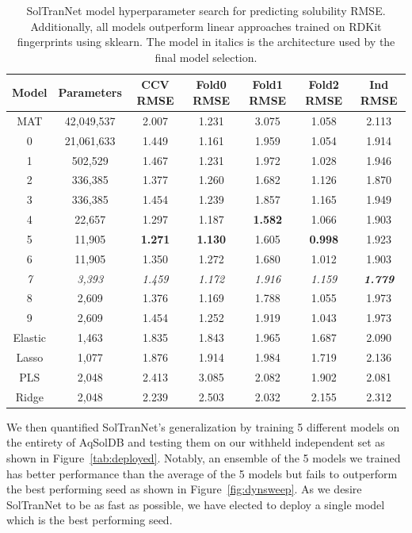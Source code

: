\documentclass[journal=jmcmar,manuscript=article]{achemso}
\begin{document}
\begin{table}
    \begin{tabular}{|c|c|c|c|c|c|c|}
        \hline
         Model & Parameters & CCV RMSE & Fold0 RMSE & Fold1 RMSE & Fold2 RMSE & Ind RMSE \\
         \hline
         MAT & 42,049,537 & 2.007 & 1.231 & 3.075 & 1.058 & 2.113  \\
         \hline
         0 & 21,061,633 & 1.449 & 1.161 & 1.959 & 1.054 & 1.914 \\
         1 & 502,529 & 1.467 & 1.231 & 1.972 & 1.028 & 1.946 \\
         2 & 336,385 & 1.377 & 1.260 & 1.682 & 1.126 & 1.870 \\
         3 & 336,385 & 1.454 & 1.239 & 1.857 & 1.165 & 1.949 \\
         4 & 22,657 & 1.297 & 1.187 & \textbf{1.582} & 1.066 & 1.903 \\
         5 & 11,905 & \textbf{1.271} & \textbf{1.130} & 1.605 & \textbf{0.998} & 1.923 \\
         6 & 11,905 & 1.350 & 1.272 & 1.680 & 1.012 & 1.903\\
         \emph{7} & \emph{3,393} & \emph{1.459} & \emph{1.172} & \emph{1.916} & \emph{1.159} & \emph{\textbf{1.779}}\\
         8 & 2,609 & 1.376 & 1.169 & 1.788 & 1.055  & 1.973 \\
         9 & 2,609 & 1.454 & 1.252 & 1.919 & 1.043  & 1.973 \\
         \hline
         Elastic & 1,463 & 1.835 & 1.843 & 1.965 & 1.687  & 2.090\\
         Lasso & 1,077 & 1.876 & 1.914 & 1.984 & 1.719 & 2.136\\
         PLS & 2,048 & 2.413 & 3.085 & 2.082 & 1.902 & 2.081\\
         Ridge & 2,048 & 2.239 & 2.503 & 2.032 & 2.155 & 2.312 \\
         \hline
    \end{tabular}
    \caption{SolTranNet model hyperparameter search for predicting solubility RMSE. Additionally, all models outperform linear approaches trained on RDKit fingerprints using sklearn\cite{scikit-learn}. The model in italics is the architecture used by the final model selection.}
    \label{tab:solsearchrmse}
\end{table}

We then quantified SolTranNet's generalization by training 5 different models on the entirety of AqSolDB and testing them on our withheld independent set as shown in Figure~\ref{tab:deployed}.
Notably, an ensemble of the 5 models we trained has better performance than the average of the 5 models but fails to outperform the best performing seed as shown in Figure~\ref{fig:dynsweep}.
As we desire SolTranNet to be as fast as possible, we have elected to deploy a single model which is the best performing seed.
\end{document}
